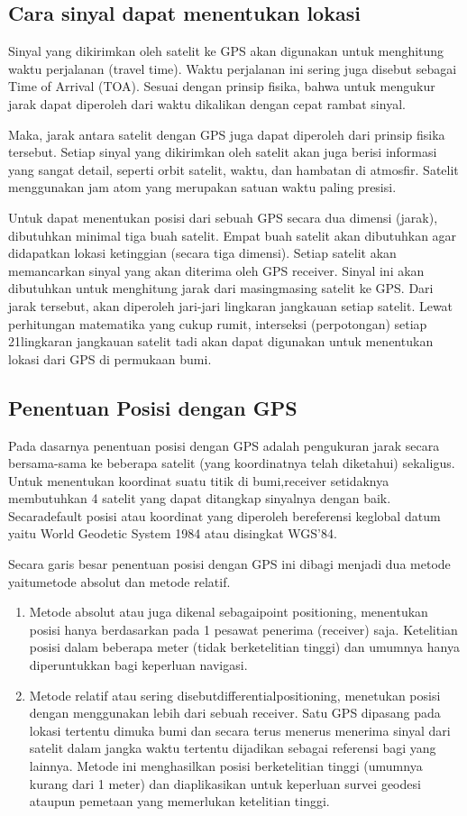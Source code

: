 \subsection{Cara sinyal dapat menentukan lokasi}
Sinyal yang dikirimkan oleh satelit ke GPS akan digunakan untuk menghitung waktu perjalanan (travel time). Waktu perjalanan ini sering juga disebut sebagai Time of Arrival (TOA). Sesuai dengan prinsip fisika, bahwa untuk mengukur jarak dapat diperoleh dari waktu dikalikan dengan cepat rambat sinyal.

Maka, jarak antara satelit dengan GPS juga dapat diperoleh dari prinsip fisika tersebut. Setiap sinyal yang dikirimkan oleh satelit akan juga berisi informasi yang sangat detail, seperti orbit satelit, waktu, dan hambatan di atmosfir. Satelit menggunakan jam atom yang merupakan satuan waktu paling presisi. 

Untuk dapat menentukan posisi dari sebuah GPS secara dua dimensi (jarak), dibutuhkan minimal tiga buah satelit. Empat buah satelit akan dibutuhkan agar didapatkan lokasi ketinggian (secara tiga dimensi). Setiap satelit akan memancarkan sinyal yang akan diterima oleh GPS receiver. Sinyal ini akan dibutuhkan untuk menghitung jarak dari masingmasing satelit ke GPS. Dari jarak tersebut, akan diperoleh jari-jari lingkaran jangkauan setiap satelit. Lewat perhitungan matematika yang cukup rumit, interseksi (perpotongan) setiap 21lingkaran jangkauan satelit tadi akan dapat digunakan untuk menentukan lokasi dari GPS di permukaan bumi.

\subsection{Penentuan Posisi dengan GPS}
Pada dasarnya penentuan posisi dengan GPS adalah pengukuran jarak secara bersama-sama ke beberapa satelit (yang koordinatnya telah diketahui) sekaligus. Untuk menentukan koordinat suatu titik di bumi,receiver setidaknya membutuhkan 4 satelit yang dapat ditangkap sinyalnya dengan baik. Secaradefault posisi atau koordinat yang diperoleh bereferensi keglobal datum yaitu World Geodetic System 1984 atau disingkat WGS'84.

Secara garis besar penentuan posisi dengan GPS ini dibagi menjadi dua metode yaitumetode absolut dan metode relatif. 
\begin{enumerate}
	\item Metode absolut atau juga dikenal sebagaipoint positioning, menentukan posisi hanya berdasarkan pada 1 pesawat penerima (receiver) saja. Ketelitian posisi dalam beberapa meter (tidak berketelitian tinggi) dan umumnya hanya diperuntukkan bagi keperluan navigasi. 
	\item Metode relatif atau sering disebutdifferentialpositioning, menetukan posisi dengan menggunakan lebih dari sebuah receiver. Satu GPS dipasang pada lokasi tertentu dimuka bumi dan secara terus menerus menerima sinyal dari satelit dalam jangka waktu tertentu dijadikan sebagai referensi bagi yang lainnya. Metode ini menghasilkan posisi berketelitian tinggi (umumnya kurang dari 1 meter) dan diaplikasikan untuk keperluan survei geodesi ataupun pemetaan yang memerlukan ketelitian tinggi.
\end{enumerate}

